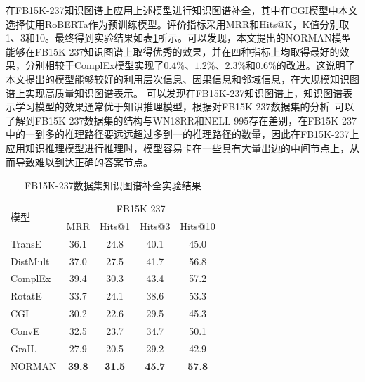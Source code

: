 \documentclass[algorithmlist, AutoFakeBold, AutoFakeSlant, figurelist, tablelist, nomlist, engineering]{seuthesix}
\begin{document}
在FB15K-237知识图谱上应用上述模型进行知识图谱补全，其中在CGI模型中本文选择使用RoBERTa作为预训练模型。评价指标采用MRR和Hits@K，K值分别取1、3和10。最终得到实验结果如表\ref{Experiment1_FB15K-237}所示。可以发现，本文提出的NORMAN模型能够在FB15K-237知识图谱上取得优秀的效果，并在四种指标上均取得最好的效果，分别相较于ComplEx模型实现了$0.4\%$、$1.2\%$、$2.3\%$和$0.6\%$的改进。这说明了本文提出的模型能够较好的利用层次信息、因果信息和邻域信息，在大规模知识图谱上实现高质量知识图谱表示。
可以发现在FB15K-237知识图谱上，知识图谱表示学习模型的效果通常优于知识推理模型，根据对FB15K-237数据集的分析~\cite{wan2021reasoning}可以了解到FB15K-237数据集的结构与WN18RR和NELL-995存在差别，在FB15K-237中的一到多的推理路径要远远超过多到一的推理路径的数量，因此在FB15K-237上应用知识推理模型进行推理时，模型容易卡在一些具有大量出边的中间节点上，从而导致难以到达正确的答案节点。
\begin{table}[]
  \centering
  \begin{tabular*}{0.95\textwidth}{@{\extracolsep{\fill}}lcccc}
  \toprule[1pt]
  \multirow{2}{*}{模型} & \multicolumn{4}{c}{FB15K-237} \\
    & MRR & Hits@1 & Hits@3 & Hits@10 \\ \hline
  TransE & 36.1 & 24.8 & 40.1 & 45.0 \\
  DistMult & 37.0 & 27.5 & 41.7 & 56.8 \\
  ComplEx & 39.4 & 30.3 & 43.4 & 57.2 \\
  RotatE & 33.7 & 24.1 & 38.6  & 53.3 \\
  CGI & 30.2 & 22.6 & 29.5 & 45.3 \\
  ConvE & 32.5 & 23.7 & 34.7 & 50.1 \\
  GraIL & 27.9 & 20.5 & 29.2 & 42.9 \\
  NORMAN & \textbf{39.8} & \textbf{31.5} & \textbf{45.7} & \textbf{57.8} \\
  \bottomrule[1pt]
  \end{tabular*}
  \caption{FB15K-237数据集知识图谱补全实验结果}
  \label{Experiment1_FB15K-237}
\end{table}
\end{document}
